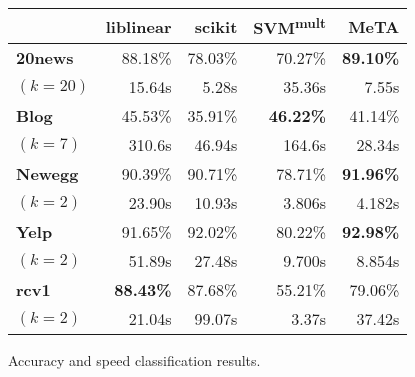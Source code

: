 \begin{figure}[t]
\centering
{\small
\begin{tabular}{|l|r|r|r|r|}
  \hline
  & \textbf{liblinear} & \textbf{scikit} &
  \textbf{SVM\textsuperscript{mult}} & \textbf{MeTA}\\\hline
  \textbf{20news}                    & 88.18\%          & 78.03\%  & 70.27\%          & \textbf{89.10\%}\\
  $(k=20)$                           & 15.64s           & 5.28s    & 35.36s           & 7.55s\\\hline
  \textbf{Blog}                      & 45.53\%          & 35.91\%  & \textbf{46.22\%} & 41.14\%\\
  $(k=7)$                            & 310.6s           & 46.94s   & 164.6s           & 28.34s\\\hline
  \textbf{Newegg}                    & 90.39\%          & 90.71\%  & 78.71\%          & \textbf{91.96\%}\\
  $(k=2)$                            & 23.90s           & 10.93s   & 3.806s           & 4.182s\\\hline
  \textbf{Yelp}                      & 91.65\%          & 92.02\%  & 80.22\%          & \textbf{92.98\%}\\
  $(k=2)$                            & 51.89s           & 27.48s   & 9.700s           & 8.854s\\\hline
  \textbf{rcv1}                      & \textbf{88.43\%} & 87.68\%  & 55.21\%          & 79.06\%\\
  $(k=2)$                            & 21.04s           & 99.07s   & 3.37s            & 37.42s\\\hline
\end{tabular}
}
\caption{Accuracy and speed classification results.}
\label{fig:classification}
\end{figure}
